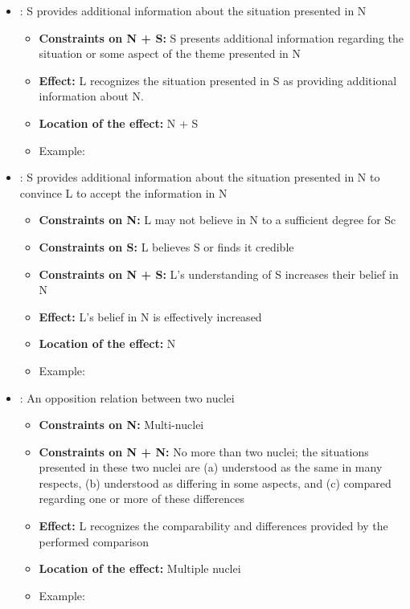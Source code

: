 \documentclass{KBook}
\begin{document}
\begin{itemize}
	\item {}: S provides additional information about the situation presented in N
	\begin{itemize}
		\item \textbf{Constraints on N + S:} S presents additional information regarding the situation or some aspect of the theme presented in N
		\item \textbf{Effect:} L recognizes the situation presented in S as providing additional information about N.
		\item \textbf{Location of the effect:} N + S
		\item Example: 
	\end{itemize}
	
	\item {}: S provides additional information about the situation presented in N to convince L to accept the information in N
	\begin{itemize}
		\item \textbf{Constraints on N:} L may not believe in N to a sufficient degree for Sc
		\item \textbf{Constraints on S:} L believes S or finds it credible
		\item \textbf{Constraints on N + S:} L's understanding of S increases their belief in N
		\item \textbf{Effect:} L's belief in N is effectively increased
		\item \textbf{Location of the effect:} N
		\item Example: 
	\end{itemize}
	
	\item {}: An opposition relation between two nuclei
	\begin{itemize}
		\item \textbf{Constraints on N:} Multi-nuclei
		\item \textbf{Constraints on N + N:} No more than two nuclei; the situations presented in these two nuclei are (a) understood as the same in many respects, (b) understood as differing in some aspects, and (c) compared regarding one or more of these differences
		\item \textbf{Effect:} L recognizes the comparability and differences provided by the performed comparison
		\item \textbf{Location of the effect:} Multiple nuclei
		\item Example: 
	\end{itemize}
	

\end{itemize}
\end{document}
